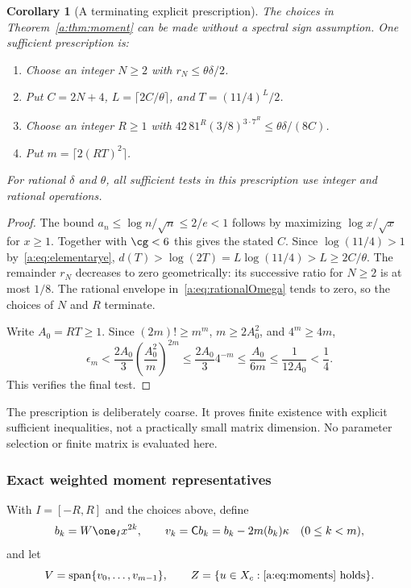 \documentclass[11pt,a4paper]{article}
\numberwithin{equation}{section}
\newtheorem{corollary}[theorem]{Corollary}
\theoremstyle{definition}\newtheorem{definition}[theorem]{Definition}
\theoremstyle{remark}\newtheorem{remark}[theorem]{Remark}
\begin{document}
\begin{corollary}[A terminating explicit prescription]\label{a:cor:choices}
The choices in Theorem~\ref{a:thm:moment} can be made without a spectral sign assumption. One sufficient prescription is:
\begin{enumerate}
\item Choose an integer $N\ge2$ with $r_N\le\theta\delta/2$.
\item Put $C=2N+4$, $L=\lceil2C/\theta\rceil$, and $T=(11/4)^L/2$.
\item Choose an integer $R\ge1$ with
$42\,81^R(3/8)^{3\cdot7^R}\le\theta\delta/(8C)$.
\item Put $m=\lceil2(RT)^2\rceil$.
\end{enumerate}
For rational $\delta$ and $\theta$, all sufficient tests in this prescription use integer and rational operations.
\end{corollary}
\begin{proof}
The bound $a_n\le\log n/\sqrt n\le2/e<1$ follows by maximizing $\log x/\sqrt x$ for $x\ge1$. Together with $\cg<6$ this gives the stated $C$. Since $\log(11/4)>1$ by~\eqref{a:eq:elementarye},
$d(T)>\log(2T)=L\log(11/4)>L\ge2C/\theta$.
The remainder $r_N$ decreases to zero geometrically: its successive ratio for $N\ge2$ is at most $1/8$. The rational envelope in~\eqref{a:eq:rationalOmega} tends to zero, so the choices of $N$ and $R$ terminate.

Write $A_0=RT\ge1$. Since $(2m)!\ge m^m$, $m\ge2A_0^2$, and $4^m\ge4m$,
\[
 \epsilon_m<\frac{2A_0}{3}\left(\frac{A_0^2}{m}\right)^{2m}
 \le\frac{2A_0}{3}4^{-m}
 \le\frac{A_0}{6m}\le\frac1{12A_0}<\frac14.
\]
This verifies the final test.
\end{proof}

The prescription is deliberately coarse. It proves finite existence with explicit sufficient inequalities, not a practically small matrix dimension. No parameter selection or finite matrix is evaluated here.

\subsubsection{Exact weighted moment representatives}

With $I=[-R,R]$ and the choices above, define
\begin{equation}\label{a:eq:momentbasis}
 b_k=W\one_Ix^{2k},\qquad
 v_k=\mathsf Cb_k=b_k-2m(b_k)\kappa\quad(0\le k<m),
\end{equation}
and let
\begin{equation}\label{a:eq:VZ}
 V=\operatorname{span}\{v_0,\ldots,v_{m-1}\},\qquad
 Z=\{u\in X_c:\text{\eqref{a:eq:moments} holds}\}.
\end{equation}
\end{document}

